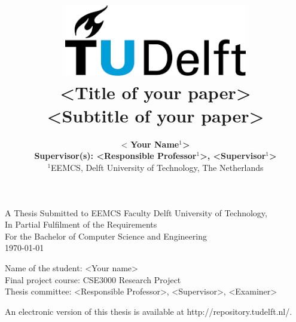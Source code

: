 \title{
    \includegraphics[width=8cm, keepaspectratio]{tudelftlogo.png}\\
    \vspace*{2cm}
    \textbf{
        \textless Title of your paper\textgreater\\
        {\large \textless Subtitle of your paper\textgreater}
    }\\
    \vspace*{1cm}
}

\author{
    \textless \textbf{
Your Name$^1$\textgreater}\\
    \hfill \break
    \textbf{Supervisor(s): \textless Responsible Professor$^1$\textgreater, \textless Supervisor$^1$\textgreater }\\
    \break
    {\large 
        \hfill \break
        $^1$EEMCS, Delft University of Technology, The Netherlands
    }\\
}

\date{}

\maketitle
\thispagestyle{empty}

\let\clearpagebackup\clearpage
\renewcommand{\clearpage}{ }

\onecolumn

\vspace*{1.5cm}
\begin{center}
    A Thesis Submitted to EEMCS Faculty Delft University of Technology,\\
    In Partial Fulfilment of the Requirements\\
    For the Bachelor of Computer Science and Engineering\\
    \today
\end{center}

\vspace*{2cm}

\noindent
{\small
Name of the student: \textless Your name\textgreater\\
Final project course: CSE3000 Research Project\\
Thesis committee: \textless Responsible Professor\textgreater, \textless Supervisor\textgreater, \textless Examiner\textgreater\\
}
\vfill

\begin{center}
    An electronic version of this thesis is available at http://repository.tudelft.nl/.
\end{center}

\twocolumn
\let\clearpage\clearpagebackup  
\clearpage
\setcounter{page}{1}
